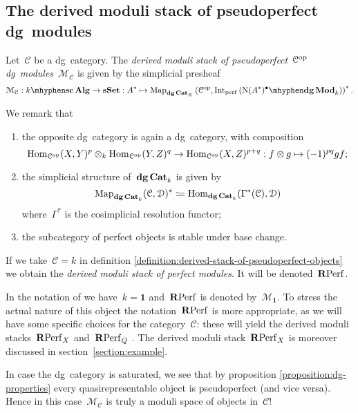 \begin{refsection}
\subsection{The derived moduli stack of pseudoperfect dg~modules}
\begin{definition}
  \label{definition:derived-stack-of-pseudoperfect-objects}
  Let~$\mathcal{C}$ be a dg~category. The \emph{derived moduli stack of pseudoperfect~$\mathcal{C}^{\mathrm{op}}$\dash dg~modules}~$\mathcal{M}_{\mathcal{C}}$ is given by the simplicial presheaf
  \begin{equation}
    \mathcal{M}_{\mathcal{C}}:\scAlg{k}\to\sSet:A^*\mapsto\Map_{\dgCat_K}\left( \mathcal{C}^\opp,\Int_\perf\left( \dgMod{\nerve(A^*)^\bullet}_k \right) \right)^*.
  \end{equation}
\end{definition}

We remark that
\begin{enumerate}
  \item the opposite dg~category is again a dg~category, with composition
    \begin{equation}
      \mathrm{Hom}_{\mathcal{C}^{\mathrm{op}}}(X,Y)^p\otimes_k\mathrm{Hom}_{\mathcal{C}^{\mathrm{op}}}(Y,Z)^q\to\mathrm{Hom}_{\mathcal{C}^{\mathrm{op}}}(X,Z)^{p+q}:f\otimes g\mapsto(-1)^{pq}gf;
    \end{equation}
  \item the simplicial structure of~$\mathbf{dg\,Cat}_k$ is given by
    \begin{equation}
      \operatorname{\mathrm{Map}}_{\mathbf{dg\,Cat}_k}(\mathcal{C},\mathcal{D})^*\coloneqq\mathrm{Hom}_{\mathbf{dg\,Cat}_k}(\Gamma^*(\mathcal{C}),\mathcal{D})
    \end{equation}
    where~$\Gamma^*$ is the cosimplicial resolution functor;
  \item the subcategory of perfect objects is stable under base change.
\end{enumerate}

\begin{definition}
  If we take~$\mathcal{C}=k$ in definition \ref{definition:derived-stack-of-pseudoperfect-objects} we obtain the \emph{derived moduli stack of perfect modules}. It will be denoted~$\mathbf{R}\mathrm{Perf}$.
\end{definition}

In the notation of \cite{toen-vaquie-moduli-of-objects-in-dg-categories} we have~$k=\mathbf{1}$ and~$\mathbf{R}\mathrm{Perf}$ is denoted by~$\mathcal{M}_{\mathbf{1}}$. To stress the actual nature of this object the notation~$\mathbf{R}\mathrm{Perf}$ is more appropriate, as we will have some specific choices for the category~$\mathcal{C}$: these will yield the derived moduli stacks~$\mathbf{R}\mathrm{Perf}_X$ and~$\mathbf{R}\mathrm{Perf}_Q$ \cite[section 3.5]{toen-vaquie-moduli-of-objects-in-dg-categories}. The derived moduli stack~$\mathbf{R}\mathrm{Perf}_X$ is moreover discussed in section~\ref{section:example}.
\begin{remark}
  \label{remark:saturated}
  In case the dg~category is saturated, we see that by proposition \ref{proposition:dg-properties} every quasirepresentable object is pseudoperfect (and vice versa). Hence in this case~$\mathcal{M}_{\mathcal{C}}$ is truly a moduli space of objects in~$\mathcal{C}$!
\end{remark}


\end{refsection}
